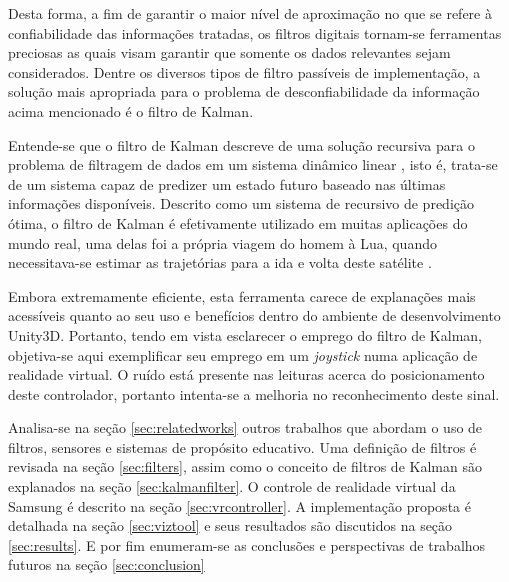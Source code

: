 \documentclass[conference]{IEEEtran}
\begin{document}
Desta forma, a fim de garantir o maior nível de aproximação no que se refere à confiabilidade das informações tratadas, os filtros digitais tornam-se ferramentas preciosas as quais visam garantir que somente os dados relevantes sejam considerados. Dentre os diversos tipos de filtro passíveis de implementação, a solução mais apropriada para o problema de desconfiabilidade da informação acima mencionado é o filtro de Kalman.

Entende-se que o filtro de Kalman descreve de uma solução recursiva para o problema de filtragem de dados em um sistema dinâmico linear \cite{WelchBishop}, isto é, trata-se de um sistema capaz de predizer um estado futuro baseado nas últimas informações disponíveis. Descrito como um sistema de recursivo de predição ótima, o filtro de Kalman é efetivamente utilizado em muitas aplicações do mundo real, uma delas foi a própria viagem do homem à Lua, quando necessitava-se estimar as trajetórias para a ida e volta deste satélite \cite{GrewalAndrews}.

Embora extremamente eficiente, esta ferramenta carece de explanações mais acessíveis quanto ao seu uso e benefícios dentro do ambiente de desenvolvimento Unity3D. Portanto, tendo em vista esclarecer o emprego do filtro de Kalman, objetiva-se aqui exemplificar seu emprego em um \textit{ joystick} numa aplicação de realidade virtual. O ruído está presente nas leituras acerca do posicionamento deste controlador, portanto intenta-se a melhoria no reconhecimento deste sinal.



Analisa-se na seção \ref{sec:relatedworks} outros trabalhos que abordam o uso de filtros, sensores e sistemas de propósito educativo. Uma definição de filtros é revisada na seção \ref{sec:filters}, assim como o conceito de filtros de Kalman são explanados na seção \ref{sec:kalmanfilter}. O controle de realidade virtual da Samsung é descrito na seção \ref{sec:vrcontroller}. A implementação proposta é detalhada na seção \ref{sec:viztool} e seus resultados são discutidos na seção \ref{sec:results}. E por fim enumeram-se as conclusões e perspectivas de trabalhos futuros na seção \ref{sec:conclusion}
\end{document}
